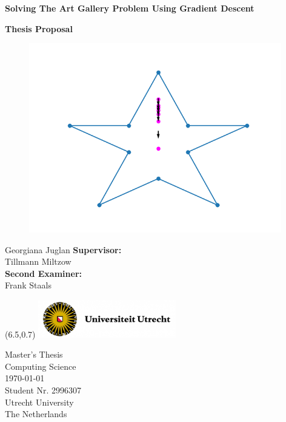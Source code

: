 \documentclass{article}
\begin{document}

\thispagestyle{empty} 
\begin{center}
    \vspace*{0.5cm}
    \huge
    \textbf{Solving The Art Gallery Problem Using Gradient Descent}

    \vspace*{0.4cm}
    \LARGE
    \textbf{Thesis Proposal}
    \vspace*{2cm}

    \begin{figure}[H]
        \centering   
        \includegraphics[width = 11cm]{Figures/title.png}
    \end{figure}


    \vspace{-1cm}
    \LARGE
    Georgiana Juglan
    \vfill 
    \large    
    \textbf{Supervisor:} \\
    Tillmann Miltzow \\
    \textbf{Second Examiner:} \\
    Frank Staals \\
     
\end{center}
   

\begin{textblock}{3}(6.5,0.7)
\includegraphics[width = 6cm]{Figures/UU logo.png}
\end{textblock}

\begin{flushleft}
    \vspace{0.5cm}
    Master's Thesis \\
    Computing Science\\
    \today\\
    Student Nr. 2996307 \\
    Utrecht University\\
    The Netherlands
\end{flushleft}
\end{document}

